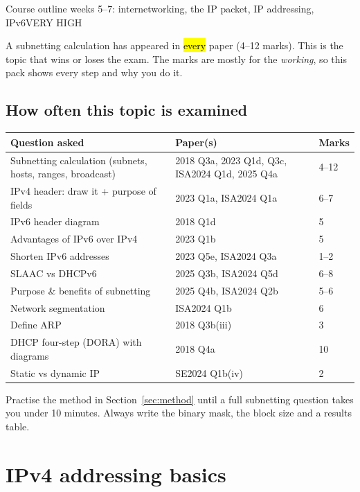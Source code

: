 \documentclass[10pt]{article}
\begin{document}
  {Course outline weeks 5--7: internetworking, the IP packet, IP addressing, IPv6}{VERY HIGH}

A subnetting calculation has appeared in \hl{every} paper (4--12 marks). This is the topic that wins or loses the exam.
The marks are mostly for the \emph{working}, so this pack shows every step and why you do it.

\subsection*{How often this topic is examined}
\begin{tabularx}{\linewidth}{@{}Xll@{}}
\toprule
\textbf{Question asked} & \textbf{Paper(s)} & \textbf{Marks}\\
\midrule
Subnetting calculation (subnets, hosts, ranges, broadcast) & 2018 Q3a, 2023 Q1d, Q3c, ISA2024 Q1d, 2025 Q4a & 4--12\\
IPv4 header: draw it + purpose of fields & 2023 Q1a, ISA2024 Q1a & 6--7\\
IPv6 header diagram & 2018 Q1d & 5\\
Advantages of IPv6 over IPv4 & 2023 Q1b & 5\\
Shorten IPv6 addresses & 2023 Q5e, ISA2024 Q3a & 1--2\\
SLAAC vs DHCPv6 & 2025 Q3b, ISA2024 Q5d & 6--8\\
Purpose \& benefits of subnetting & 2025 Q4b, ISA2024 Q2b & 5--6\\
Network segmentation & ISA2024 Q1b & 6\\
Define ARP & 2018 Q3b(iii) & 3\\
DHCP four-step (DORA) with diagrams & 2018 Q4a & 10\\
Static vs dynamic IP & SE2024 Q1b(iv) & 2\\
\bottomrule
\end{tabularx}

\begin{examtip}
Practise the method in Section~\ref{sec:method} until a full subnetting question takes you under 10 minutes.
Always write the binary mask, the block size and a results table.
\end{examtip}

\section{IPv4 addressing basics}
\end{document}
